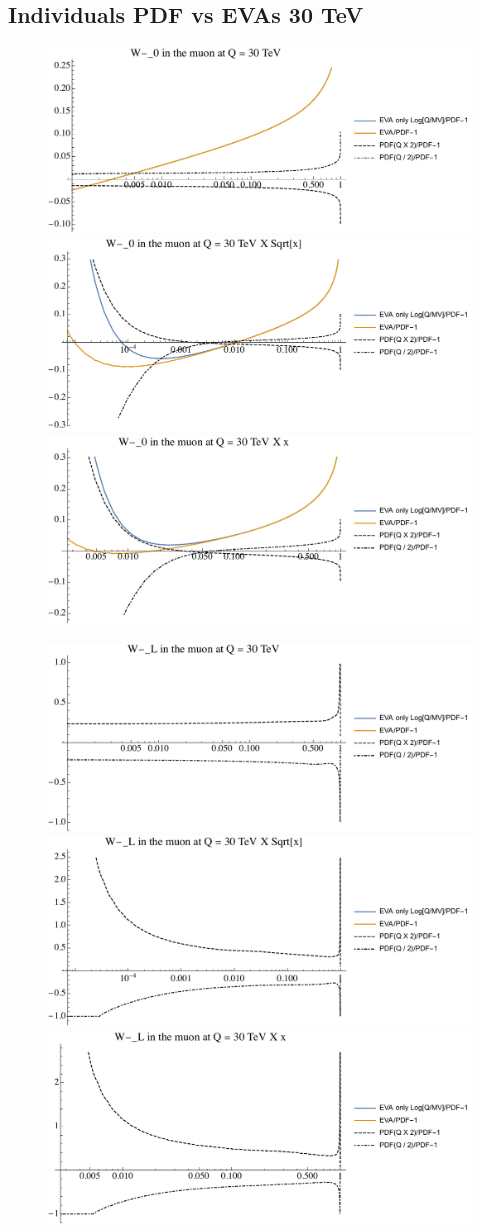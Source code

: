 \documentclass[a4paper,11pt]{article}
\begin{document}
\clearpage
\subsection{Individuals PDF vs EVAs 30 TeV}

\begin{figure}[ht]
\includegraphics[width=0.46\linewidth]{Notebooks/PlotPDFs/ratios/30TeV/W-_0_Q.pdf}
\includegraphics[width=0.46\linewidth]{Notebooks/PlotPDFs/ratios/30TeV/W-_0_Qsqrtx.pdf}
\includegraphics[width=0.46\linewidth]{Notebooks/PlotPDFs/ratios/30TeV/W-_0_Qx.pdf}
\end{figure}

\begin{figure}[ht]
\includegraphics[width=0.46\linewidth]{Notebooks/PlotPDFs/ratios/30TeV/W-_L_Q.pdf}
\includegraphics[width=0.46\linewidth]{Notebooks/PlotPDFs/ratios/30TeV/W-_L_Qsqrtx.pdf}
\includegraphics[width=0.46\linewidth]{Notebooks/PlotPDFs/ratios/30TeV/W-_L_Qx.pdf}
\end{figure}
\end{document}
